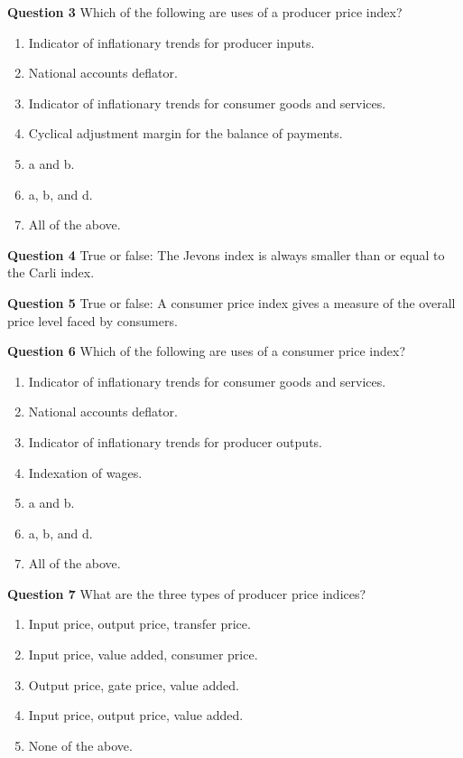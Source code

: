 \documentclass[
]{article}
\begin{document}
\textbf{Question 3} Which of the following are uses of a producer price index?

\begin{enumerate}
\def\labelenumi{\alph{enumi})}
\item
  Indicator of inflationary trends for producer inputs.
\item
  National accounts deflator.
\item
  Indicator of inflationary trends for consumer goods and services.
\item
  Cyclical adjustment margin for the balance of payments.
\item
  a and b.
\item
  a, b, and d.
\item
  All of the above.
\end{enumerate}

\textbf{Question 4} True or false: The Jevons index is always smaller than or equal to the Carli index.

\textbf{Question 5} True or false: A consumer price index gives a measure of the overall price level faced by consumers.

\textbf{Question 6} Which of the following are uses of a consumer price index?

\begin{enumerate}
\def\labelenumi{\alph{enumi})}
\item
  Indicator of inflationary trends for consumer goods and services.
\item
  National accounts deflator.
\item
  Indicator of inflationary trends for producer outputs.
\item
  Indexation of wages.
\item
  a and b.
\item
  a, b, and d.
\item
  All of the above.
\end{enumerate}

\textbf{Question 7} What are the three types of producer price indices?

\begin{enumerate}
\def\labelenumi{\alph{enumi})}
\item
  Input price, output price, transfer price.
\item
  Input price, value added, consumer price.
\item
  Output price, gate price, value added.
\item
  Input price, output price, value added.
\item
  None of the above.
\end{enumerate}
\end{document}
